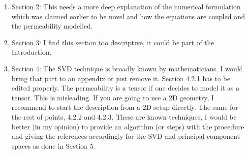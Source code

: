 \documentclass[11pt]{letter} %
\begin{document}
\begin{letter}
{\begin{enumerate}
\begin{enumerate}
\item Section 2: This needs a more deep explanation of the numerical formulation which was claimed earlier to be novel and how the equations are coupled and the permeability modelled.\\
\item Section 3: I find this section too descriptive, it could be part of the Introduction.\\
\item Section 4: The SVD technique is broadly known by mathematicians. I would bring that part to an appendix or just remove it. Section 4.2.1 has to be edited properly. The permeability is a tensor if one decides to model it as a tensor. This is misleading. If you are going to use a 2D geometry, I recommend to start the description from a 2D setup directly. The same for the rest of points, 4.2.2 and 4.2.3. These are known techniques, I would be better (in my opinion) to provide an algorithm (or steps) with the procedure and giving the references accordingly for the SVD and principal component spaces as done in Section 5.
\end{enumerate}
\end{enumerate}
}



\end{letter}
\end{document}
